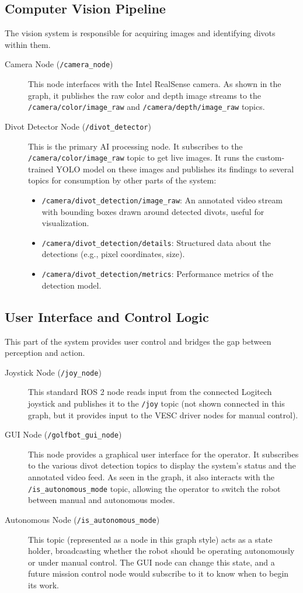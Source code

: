 \subsection{Computer Vision Pipeline}
The vision system is responsible for acquiring images and identifying divots within them.
\begin{description}
    \item[Camera Node (\texttt{/camera\_node})] This node interfaces with the Intel RealSense camera. As shown in the graph, it publishes the raw color and depth image streams to the \texttt{/camera/color/image\_raw} and \texttt{/camera/depth/image\_raw} topics.
    \item[Divot Detector Node (\texttt{/divot\_detector})] This is the primary AI processing node. It subscribes to the \texttt{/camera/color/image\_raw} topic to get live images. It runs the custom-trained YOLO model on these images and publishes its findings to several topics for consumption by other parts of the system:
    \begin{itemize}
        \item \texttt{/camera/divot\_detection/image\_raw}: An annotated video stream with bounding boxes drawn around detected divots, useful for visualization.
        \item \texttt{/camera/divot\_detection/details}: Structured data about the detections (e.g., pixel coordinates, size).
        \item \texttt{/camera/divot\_detection/metrics}: Performance metrics of the detection model.
    \end{itemize}
\end{description}

\subsection{User Interface and Control Logic}
This part of the system provides user control and bridges the gap between perception and action.
\begin{description}
    \item[Joystick Node (\texttt{/joy\_node})] This standard ROS 2 node reads input from the connected Logitech joystick and publishes it to the \texttt{/joy} topic (not shown connected in this graph, but it provides input to the VESC driver nodes for manual control).
    \item[GUI Node (\texttt{/golfbot\_gui\_node})] This node provides a graphical user interface for the operator. It subscribes to the various divot detection topics to display the system's status and the annotated video feed. As seen in the graph, it also interacts with the \texttt{/is\_autonomous\_mode} topic, allowing the operator to switch the robot between manual and autonomous modes.
    \item[Autonomous Node (\texttt{/is\_autonomous\_mode})] This topic (represented as a node in this graph style) acts as a state holder, broadcasting whether the robot should be operating autonomously or under manual control. The GUI node can change this state, and a future mission control node would subscribe to it to know when to begin its work.
\end{description}

